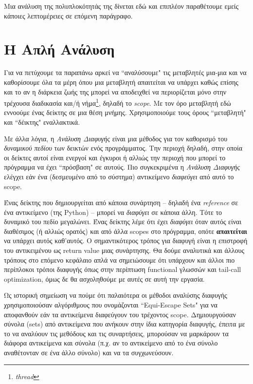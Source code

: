 Μια ανάλυση της πολυπλοκότητάς της δίνεται εδώ\cite{complexity} και επιπλέον
παραθέτουμε εμείς κάποιες λεπτομέρειες σε επόμενη παράγραφο.


\section{Η Απλή Ανάλυση}

Για να πετύχουμε τα παραπάνω αρκεί να ``αναλύσουμε" τις μεταβλητές μια-μια και να
καθορίσουμε όλα τα μέρη όπου μια μεταβλητή απαιτείται να υπάρχει καθώς επίσης
και το αν η διάρκεια ζωής της μπορεί να αποδειχθεί να περιορίζεται μόνο στην
τρέχουσα διαδικασία και/ή νήμα\footnote{\textit{thread}}, δηλαδή το
\textit{scope}. Με τον όρο μεταβλητή εδώ εννοούμε ένας δείκτης σε μια θέση
μνήμης. Χρησιμοποιούμε τους όρους ``μεταβλητή" και ``δέικτης" εναλλακτικά.

Με άλλα λόγια, η \textit{Ανάλυση Διαφυγής} είναι μια μέθοδος για τον καθορισμό
του \textit{δυναμικού πεδίου} των δεικτών ενός προγράμματος. Την περιοχή δηλαδή,
στην οποία οι δείκτες αυτοί είναι ενεργοί και έγκυροι ή αλλιώς την περιοχή που
μπορεί το πρόγραμμα να έχει ``πρόσβαση" σε αυτούς. Πιο συγκεκριμένα η
\textit{Ανάλυση Διαφυγής} ελέγχει εάν ένα (δεσμευμένο από το σύστημα)
αντικείμενο \textit{διαφεύγει} από αυτό το scope.

Ένας δείκτης που δημιουργείται από κάποια συνάρτηση – δηλαδή ένα
\textit{reference} σε ένα αντικείμενο (της Python) – μπορεί να \textit{διαφύγει}
σε κάποια άλλη. Τότε το δυναμικό του πεδίο μεγαλώνει. Ένας δείκτης λέμε ότι έχει
\textit{διαφύγει} όταν αυτός είναι διαθέσιμος (ή αλλιώς ορατός) και από άλλα
scopes στο πρόγραμμα, οπότε \textbf{απαιτείται} να υπάρχει αυτός καθ'αυτός. Ο
σημαντικότερος τρόπος για διαφυγή είναι η επιστροφή του αντικειμένου ως return
value μιας συνάρτησης. Θα δούμε αναλυτικά και άλλους τρόπους στο επόμενο
κεφάλαιο απλά να σημειώσουμε ότι υπάρχουν και άλλοι πιο περίπλοκοι τρόποι
διαφυγής όπως στην περίπτωση functional γλωσσών και tail-call optimization, όμως
δε θα ασχοληθούμε με αυτές σε αυτή την εργασία.

Ως ιστορική σημείωση να πούμε ότι παλαιότερα οι μέθοδοι αναλύσης διαφυγής
χρησιμοποιούσαν αλγόριθμους που ονομάζονται ``Equi-Escape
Sets"\cite{kotzmann2005escape} για να αποφανθούν εάν τα αντικείμενα διαφεύγουν
του τρέχοντος scope. Δημιουργούσαν σύνολα (sets) από αντικείμενα που ανήκουν
στην ίδια κατηγορία διαφυγής, έπειτα με το να αναλύουν τις μεθόδους και τις
συναρτήσεις, μπορούσαν να μαρκάρουν τα διάφορα αντικείμενα και σύνολα (π.χ. αν
το αντικείμενο από το ένα σύνολο αναθέτονταν σε ένα άλλο σύνολο) και να τα
συγχωνεύσουν.\cite{stadler2014partial}

